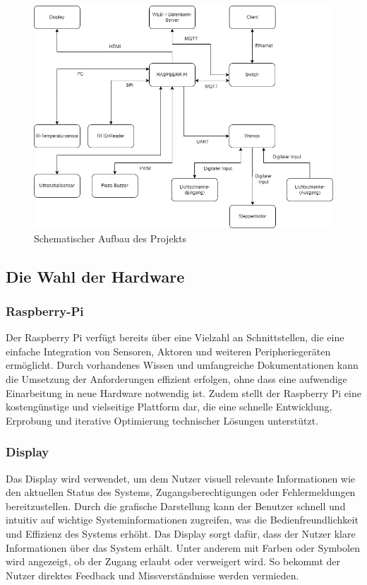 \vspace{1em}
\begin{figure}[h]
	\centering
	\includegraphics[width=0.79\linewidth]{figures/Prinzipienschaltbild.png}
	\caption[Prinzipienschaltbild]{Schematischer Aufbau des Projekts}\label{fig:prinzipienschaltbild}
\end{figure}


\subsection{Die Wahl der Hardware}\label{subsec:die_wahl_der_hardware}

\subsubsection{Raspberry-Pi}

Der Raspberry Pi verfügt bereits über eine Vielzahl an Schnittstellen, die eine einfache Integration von Sensoren, Aktoren und weiteren Peripheriegeräten ermöglicht. Durch vorhandenes Wissen und umfangreiche Dokumentationen kann die Umsetzung der Anforderungen effizient erfolgen, ohne dass eine aufwendige Einarbeitung in neue Hardware notwendig ist. Zudem stellt der Raspberry Pi eine kostengünstige und vielseitige Plattform dar, die eine schnelle Entwicklung, Erprobung und iterative Optimierung technischer Lösungen unterstützt.

\subsubsection{Display}

Das Display wird verwendet, um dem Nutzer visuell relevante Informationen wie den aktuellen Status des Systems, Zugangsberechtigungen oder Fehlermeldungen bereitzustellen. Durch die grafische Darstellung kann der Benutzer schnell und intuitiv auf wichtige Systeminformationen zugreifen, was die Bedienfreundlichkeit und Effizienz des Systems erhöht. Das Display sorgt dafür, dass der Nutzer klare Informationen über das System erhält. Unter anderem mit Farben oder Symbolen wird angezeigt, ob der Zugang erlaubt oder verweigert wird. So bekommt der Nutzer direktes Feedback und Missverständnisse werden vermieden.

